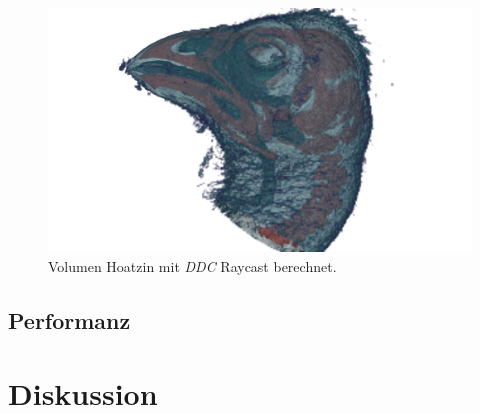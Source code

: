 \begin{landscape}
	\begin{figure}
		\centering
		\includegraphics[width=1\textheight]{../../Grafiken/results/picture_quality/hoatzin/DDC_img-1_ray-1-5.png}
		\caption{Volumen Hoatzin mit \emph{DDC} Raycast berechnet.}
		\label{fig::res::hoa_ddc}
	\end{figure}
\end{landscape}
\fi

\subsection{Performanz}






\section*{Diskussion}\label{sec::disc}
